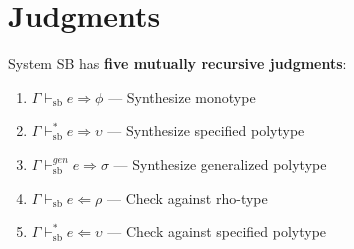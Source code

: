 \documentclass[11pt,a4paper]{article}
\begin{document}
\section{Judgments}

System SB has \textbf{five mutually recursive judgments}:

\begin{enumerate}
\item $\Gamma \vdash_{\mathrm{sb}} e \Rightarrow \phi$ --- Synthesize monotype
\item $\Gamma \vdash^*_{\mathrm{sb}} e \Rightarrow \upsilon$ --- Synthesize specified polytype
\item $\Gamma \vdash^{\mathit{gen}}_{\mathrm{sb}} e \Rightarrow \sigma$ --- Synthesize generalized polytype
\item $\Gamma \vdash_{\mathrm{sb}} e \Leftarrow \rho$ --- Check against rho-type
\item $\Gamma \vdash^*_{\mathrm{sb}} e \Leftarrow \upsilon$ --- Check against specified polytype
\end{enumerate}
\end{document}
